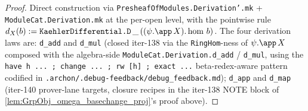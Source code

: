 \begin{proof}
  
  Direct construction via \texttt{PresheafOfModules.Derivation'.mk} +
  \texttt{ModuleCat.Derivation.mk} at the per-open level, with the
  pointwise rule
  \(d_X(b) := \texttt{KaehlerDifferential.D}\,\_\,((\psi.\app\,X).\hom\,b)\).
  The four derivation laws are: \texttt{d\_add} and \texttt{d\_mul}
  (closed iter-138 via the \texttt{RingHom}-ness of \(\psi.\app\,X\)
  composed with the algebra-side
  \texttt{ModuleCat.Derivation.d\_add} / \texttt{d\_mul}, using the
  \texttt{have\,h ... ; change ... ; rw [h] ; exact ...}
  beta-redex-aware pattern codified in
  \texttt{.archon/.debug-feedback/debug\_feedback.md}); \texttt{d\_app}
  and \texttt{d\_map} (iter-140 prover-lane targets, closure recipes
  in the iter-138 NOTE block of
  \cref{lem:GrpObj_omega_basechange_proj}'s proof above).
\end{proof}

